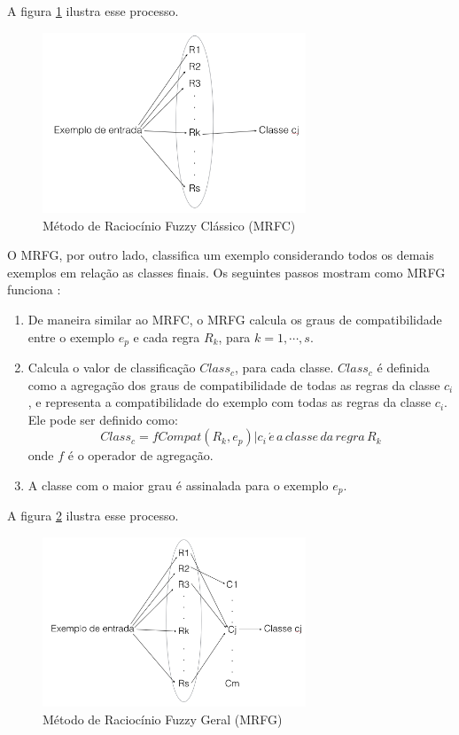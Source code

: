 \documentclass[template.tex]{subfiles}
\begin{document}
A figura \ref{fig:mrfc} ilustra esse processo.

\begin{figure}[H]  
  \caption{Método de Raciocínio Fuzzy Clássico (MRFC)}
  \label{fig:mrfc}
  \centering
    \includegraphics[width=0.7\textwidth]{mrfc}
\end{figure}

O MRFG, por outro lado, classifica um exemplo considerando todos os demais exemplos em relação as classes finais. Os seguintes passos mostram como MRFG funciona \cite{cintra2012genetic}:

\begin{enumerate}
\item De maneira similar ao MRFC, o MRFG calcula os graus de compatibilidade entre o exemplo $e_p$ e cada regra $R_k$, para $k = 1, \cdots, s$.
\item Calcula o valor de classificação $Class_c$, para cada classe. $Class_c$ é definida como a agregação dos graus de compatibilidade de todas as regras da classe $c_i$, e representa a compatibilidade do exemplo com todas as regras da classe $c_i$. Ele pode ser definido como:
\begin{equation}
Class_c = f{Compat(R_k, e_p)|c_i \, \acute{e}\, a\, classe\, da\, regra\, R_k}
\end{equation}
onde $f$ é o operador de agregação.
\item A classe com o maior grau é assinalada para o exemplo $e_p$.
\end{enumerate}

A figura \ref{fig:mrfg} ilustra esse processo.

\begin{figure}[H]  
  \caption{Método de Raciocínio Fuzzy Geral (MRFG)}
  \label{fig:mrfg}
  \centering
    \includegraphics[width=0.7\textwidth]{mrfg}
\end{figure}
\end{document}
